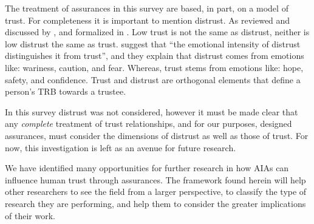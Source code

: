     The treatment of assurances in this survey are based, in part, on a model of trust. For completeness it is important to mention distrust. As reviewed and discussed by \citet{Lewicki1998-ox}, and formalized in \cite{McKnight2001-hm,McKnight2001-gz}. Low trust is not the same as distrust, neither is low distrust the same as trust. \citet{McKnight2001-gz} suggest that ``the emotional intensity of distrust distinguishes it from trust'', and they explain that distrust comes from emotions like: wariness, caution, and fear. Whereas, trust stems from emotions like: hope, safety, and confidence. Trust and distrust are orthogonal elements that define a person's TRB towards a trustee. 

    In this survey distrust was not considered, however it must be made clear that any \emph{complete} treatment of trust relationships, and for our purposes, designed assurances, must consider the dimensions of distrust as well as those of trust. For now, this investigation is left as an avenue for future research.

    We have identified many opportunities for further research in how AIAs can influence human trust through assurances. The framework found herein will help other researchers to see the field from a larger perspective, to classify the type of research they are performing, and help them to consider the greater implications of their work.

\newpage

